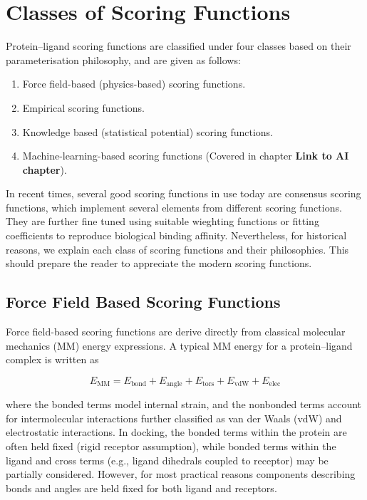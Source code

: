 \documentclass[12pt]{article}
\begin{document}
\section{Classes of Scoring Functions}

 Protein--ligand scoring functions are classified under four classes based on their parameterisation philosophy, and are given as follows:
\begin{enumerate}
    \item Force field-based (physics-based) scoring functions.
    \item Empirical scoring functions.
    \item Knowledge based (statistical potential) scoring functions.
    \item Machine-learning-based scoring functions (Covered in chapter \textbf{Link to AI chapter}).
\end{enumerate}

In recent times, several good scoring functions in use today are consensus scoring functions, which implement several elements from different scoring functions. They are further fine tuned using suitable wieghting functions or fitting coefficients to reproduce biological binding affinity. Nevertheless, for historical reasons, we explain each class of scoring functions and their philosophies. This should prepare the reader to appreciate the modern scoring functions. 

\subsection{Force Field Based Scoring Functions}

Force field-based scoring functions are derive directly from classical molecular mechanics (MM) energy expressions. A typical MM energy for a protein--ligand complex is written as

\begin{equation}
E_{\text{MM}} = E_{\text{bond}} + E_{\text{angle}} + E_{\text{tors}} + E_{\text{vdW}} + E_{\text{elec}}
\label{eq:FF_general}
\end{equation}

where the bonded terms model internal strain, and the nonbonded terms account for intermolecular interactions further classified as  van der Waals (vdW) and electrostatic interactions. In docking, the bonded terms within the protein are often held fixed (rigid receptor assumption), while bonded terms within the ligand and cross terms (e.g., ligand dihedrals coupled to receptor) may be partially considered. However, for most practical reasons components describing bonds and angles are held fixed for both ligand and receptors. 
\end{document}
